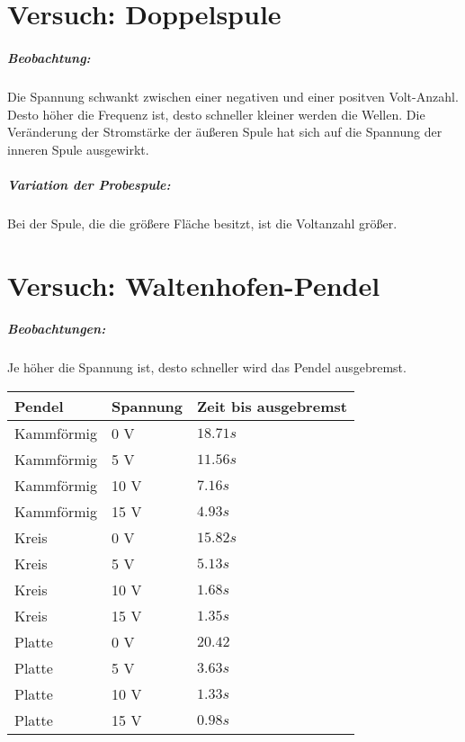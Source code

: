 \documentclass[a4paper, 12pt]{report}
\begin{document}
	\chapter{Versuch: Doppelspule}
	\paragraph{Beobachtung:}
	Die Spannung schwankt zwischen einer negativen und einer positven Volt-Anzahl.
	Desto höher die Frequenz ist, desto schneller kleiner werden die Wellen.
	Die Veränderung der Stromstärke der äußeren Spule hat sich auf die Spannung der inneren Spule ausgewirkt.
	\paragraph{Variation der Probespule:}
	Bei der Spule, die die größere Fläche besitzt, ist die Voltanzahl größer.
	\chapter{Versuch: Waltenhofen-Pendel}
	\paragraph{Beobachtungen:}
	Je höher die Spannung ist, desto schneller wird das Pendel ausgebremst.
	\\[0.6cm]
	\begin{tabularx}{\textwidth}{|X|X|X|}
		\hline
		\textbf{Pendel} & Spannung & \textbf{Zeit bis ausgebremst} \\
		\hline
		Kammförmig & 0 V & $18.71s$ \\
		\hline
		Kammförmig & 5 V & $11.56s$ \\
		\hline
		Kammförmig & 10 V & $7.16s$ \\
		\hline
		Kammförmig & 15 V & $4.93s$ \\
		\hline
		Kreis & 0 V & $15.82s$ \\
		\hline
		Kreis & 5 V & $5.13s$ \\
		\hline
		Kreis & 10 V & $1.68s$ \\
		\hline
		Kreis & 15 V & $1.35s$ \\
		\hline
		Platte & 0 V & $20.42$ \\
		\hline
		Platte & 5 V & $3.63s$ \\
		\hline
		Platte & 10 V & $1.33s$ \\
		\hline
		Platte & 15 V & $0.98s$ \\
		\hline
	\end{tabularx}
\end{document}
